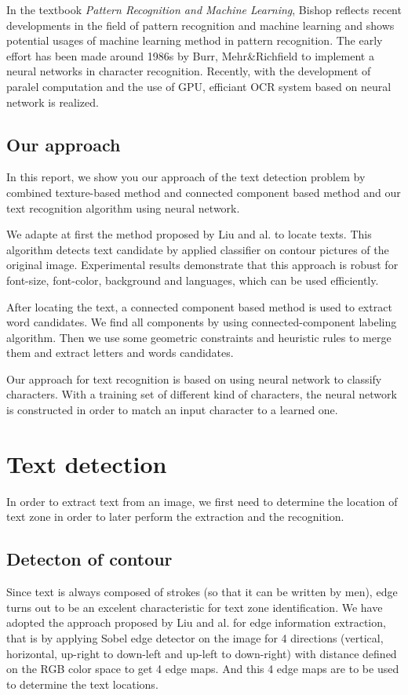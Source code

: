 \documentclass[paper=a4, french, 11pt]{scrartcl}
\begin{document}
In the textbook \textit{Pattern Recognition and Machine Learning}, Bishop reflects recent developments in the field of pattern recognition and machine learning and shows potential usages of machine learning method in pattern recognition. The early effort has been made around 1986s by Burr, Mehr\&Richfield to implement a neural networks in character recognition. Recently, with the development of paralel computation and the use of GPU, efficiant OCR system based on neural network is realized. 

\subsection{Our approach}
In this report, we show you our approach of the text detection problem by combined texture-based method and connected component based method and our text recognition algorithm using neural network. 

We adapte at first the method proposed by Liu and al. to locate texts. This algorithm detects text candidate by applied classifier on contour pictures of the original image. Experimental results demonstrate that this approach is robust for font-size, font-color, background and languages, which can be used efficiently.

After locating the text, a connected component based method is used to extract word candidates. We find all components by using connected-component labeling algorithm. Then we use some geometric constraints and heuristic rules to merge them and extract letters and words candidates.  

Our approach for text recognition is based on using neural network to classify characters. With a training set of different kind of characters, the neural network is constructed in order to match an input character to a learned one. 

\section{Text detection}
In order to extract text from an image, we first need to determine the location of text zone in order to later perform the extraction and the recognition.  
\subsection{Detecton of contour}
Since text is always composed of strokes (so that it can be written by men), edge turns out to be an excelent characteristic for text zone identification. We have adopted the approach proposed by Liu and al. for edge information extraction, that is by applying Sobel edge detector on the image for 4 directions (vertical, horizontal, up-right to down-left and up-left to down-right) with distance defined on the RGB color space to get 4 edge maps. And this 4 edge maps are to be used to determine the text locations.
\end{document}
